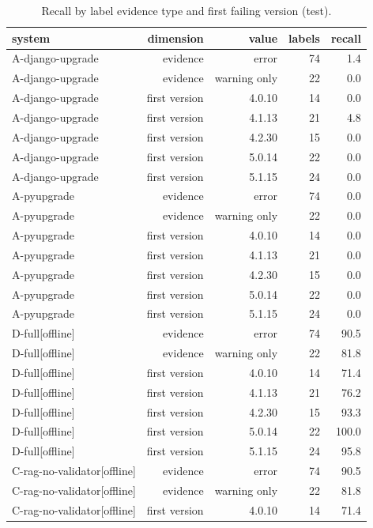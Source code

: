 \begin{table}[t]
\centering
\small
\caption{Recall by label evidence type and first failing version (test).}
\label{tab:breakdown-test}
\begin{tabular}{lrrrr}
\toprule
system & dimension & value & labels & recall \\
\midrule
A-django-upgrade & evidence & error & 74 & 1.4 \\
A-django-upgrade & evidence & warning only & 22 & 0.0 \\
A-django-upgrade & first version & 4.0.10 & 14 & 0.0 \\
A-django-upgrade & first version & 4.1.13 & 21 & 4.8 \\
A-django-upgrade & first version & 4.2.30 & 15 & 0.0 \\
A-django-upgrade & first version & 5.0.14 & 22 & 0.0 \\
A-django-upgrade & first version & 5.1.15 & 24 & 0.0 \\
A-pyupgrade & evidence & error & 74 & 0.0 \\
A-pyupgrade & evidence & warning only & 22 & 0.0 \\
A-pyupgrade & first version & 4.0.10 & 14 & 0.0 \\
A-pyupgrade & first version & 4.1.13 & 21 & 0.0 \\
A-pyupgrade & first version & 4.2.30 & 15 & 0.0 \\
A-pyupgrade & first version & 5.0.14 & 22 & 0.0 \\
A-pyupgrade & first version & 5.1.15 & 24 & 0.0 \\
D-full[offline] & evidence & error & 74 & 90.5 \\
D-full[offline] & evidence & warning only & 22 & 81.8 \\
D-full[offline] & first version & 4.0.10 & 14 & 71.4 \\
D-full[offline] & first version & 4.1.13 & 21 & 76.2 \\
D-full[offline] & first version & 4.2.30 & 15 & 93.3 \\
D-full[offline] & first version & 5.0.14 & 22 & 100.0 \\
D-full[offline] & first version & 5.1.15 & 24 & 95.8 \\
C-rag-no-validator[offline] & evidence & error & 74 & 90.5 \\
C-rag-no-validator[offline] & evidence & warning only & 22 & 81.8 \\
C-rag-no-validator[offline] & first version & 4.0.10 & 14 & 71.4 \\

\end{tabular}
\end{table}
